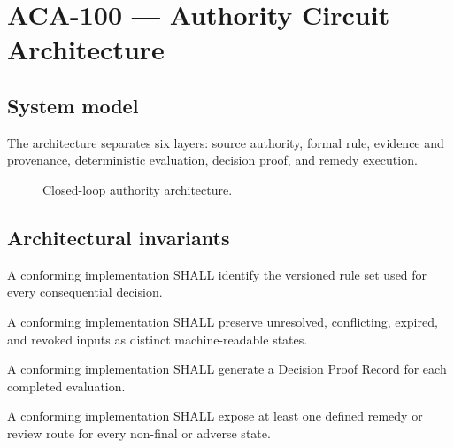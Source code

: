 \chapter{ACA-100 --- Authority Circuit Architecture}
\section{System model}
The architecture separates six layers: source authority, formal rule, evidence and provenance, deterministic evaluation, decision proof, and remedy execution.


\begin{figure}[ht]
\centering
{}
\caption{Closed-loop authority architecture.}
\end{figure}

\section{Architectural invariants}
\begin{requirement}[ACA-100-001]
A conforming implementation SHALL identify the versioned rule set used for every consequential decision.
\end{requirement}
\begin{requirement}[ACA-100-002]
A conforming implementation SHALL preserve unresolved, conflicting, expired, and revoked inputs as distinct machine-readable states.
\end{requirement}
\begin{requirement}[ACA-100-003]
A conforming implementation SHALL generate a Decision Proof Record for each completed evaluation.
\end{requirement}
\begin{requirement}[ACA-100-004]
A conforming implementation SHALL expose at least one defined remedy or review route for every non-final or adverse state.
\end{requirement}
